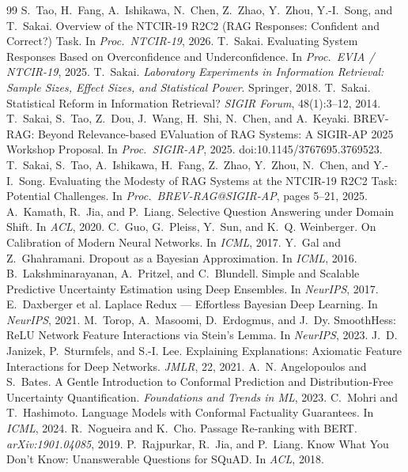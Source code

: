 \documentclass[sigconf,nonacm]{acmart}
\begin{document}
\begin{thebibliography}{99}
 S.~Tao, H.~Fang, A.~Ishikawa, N.~Chen, Z.~Zhao, Y.~Zhou, Y.-I.~Song, and T.~Sakai. Overview of the NTCIR-19 R2C2 (RAG Responses: Confident and Correct?) Task. In {\em Proc.\ NTCIR-19}, 2026.
 T.~Sakai. Evaluating System Responses Based on Overconfidence and Underconfidence. In {\em Proc.\ EVIA / NTCIR-19}, 2025.
 T.~Sakai. {\em Laboratory Experiments in Information Retrieval: Sample Sizes, Effect Sizes, and Statistical Power}. Springer, 2018.
 T.~Sakai. Statistical Reform in Information Retrieval? {\em SIGIR Forum}, 48(1):3--12, 2014.
 T.~Sakai, S.~Tao, Z.~Dou, J.~Wang, H.~Shi, N.~Chen, and A.~Keyaki. BREV-RAG: Beyond Relevance-based EValuation of RAG Systems: A SIGIR-AP 2025 Workshop Proposal. In {\em Proc.\ SIGIR-AP}, 2025. doi:10.1145/3767695.3769523.
 T.~Sakai, S.~Tao, A.~Ishikawa, H.~Fang, Z.~Zhao, Y.~Zhou, N.~Chen, and Y.-I.~Song. Evaluating the Modesty of RAG Systems at the NTCIR-19 R2C2 Task: Potential Challenges. In {\em Proc.\ BREV-RAG@SIGIR-AP}, pages 5--21, 2025.
 A.~Kamath, R.~Jia, and P.~Liang. Selective Question Answering under Domain Shift. In {\em ACL}, 2020.
 C.~Guo, G.~Pleiss, Y.~Sun, and K.~Q. Weinberger. On Calibration of Modern Neural Networks. In {\em ICML}, 2017.
 Y.~Gal and Z.~Ghahramani. Dropout as a Bayesian Approximation. In {\em ICML}, 2016.
 B.~Lakshminarayanan, A.~Pritzel, and C.~Blundell. Simple and Scalable Predictive Uncertainty Estimation using Deep Ensembles. In {\em NeurIPS}, 2017.
 E.~Daxberger et al. Laplace Redux --- Effortless Bayesian Deep Learning. In {\em NeurIPS}, 2021.
 M.~Torop, A.~Masoomi, D.~Erdogmus, and J.~Dy. SmoothHess: ReLU Network Feature Interactions via Stein's Lemma. In {\em NeurIPS}, 2023.
 J.~D. Janizek, P.~Sturmfels, and S.-I. Lee. Explaining Explanations: Axiomatic Feature Interactions for Deep Networks. {\em JMLR}, 22, 2021.
 A.~N. Angelopoulos and S.~Bates. A Gentle Introduction to Conformal Prediction and Distribution-Free Uncertainty Quantification. {\em Foundations and Trends in ML}, 2023.
 C.~Mohri and T.~Hashimoto. Language Models with Conformal Factuality Guarantees. In {\em ICML}, 2024.
 R.~Nogueira and K.~Cho. Passage Re-ranking with BERT. {\em arXiv:1901.04085}, 2019.
 P.~Rajpurkar, R.~Jia, and P.~Liang. Know What You Don't Know: Unanswerable Questions for SQuAD. In {\em ACL}, 2018.

\end{thebibliography}
\end{document}
